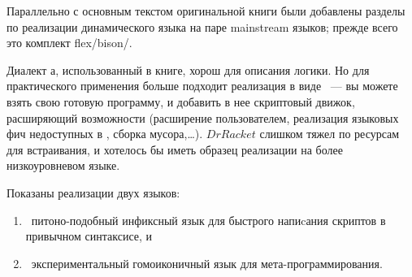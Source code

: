 \secdown{}

Параллельно с основным текстом оригинальной книги были добавлены разделы по
реализации динамического языка на паре mainstream языков; прежде всего это
комплект flex/bison/\cpp.

Диалект \lisp а, использованный в книге, хорош для описания логики. Но для
практического применения больше подходит реализация в виде
\ --- вы
можете взять свою готовую программу, и добавить в нее скриптовый движок,
расширяющий возможности (расширение пользователем, реализация языковых фич
недоступных в \cpp, сборка мусора,\ldots). $DrRacket$ слишком тяжел по ресурсам
для встраивания, и хотелось бы иметь образец реализации на более низкоуровневом
языке.

\bigskip

Показаны реализации двух языков:
\begin{enumerate}[nosep]
  \item \bi\ питоно-подобный инфиксный язык для быстрого напиcания скриптов в
  привычном синтаксисе, и
  \item \hm\ экспериментальный гомоиконичный язык для
  мета-про\-грам\-ми\-ро\-ва\-ния.
\end{enumerate}

\secup